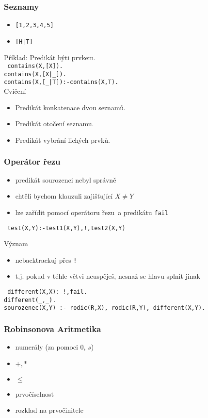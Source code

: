 \documentclass[red,professionalfont]{beamer}
\theoremstyle{definition}
\newcommand{\0}{\mbox{${\bf 0}$}}
\begin{document}
\begin{frame}\frametitle{Seznamy}
\begin{itemize}
 \item {\tt [1,2,3,4,5]}\pause
 \item {\tt [H|T]}\pause
\end{itemize}
 \vskip0.7cm
\alert{Příklad:} Predikát býti prvkem.\pause\\
{\tt
 contains(X,[X]).\pause\\
 contains(X,[X|\_]).\pause\\
 contains(X,[\_|T]):-contains(X,T).\pause\\
 }
 \vskip0.7cm
 \alert{Cvičení}\pause
\begin{itemize}
 \item[1] Predikát konkatenace dvou seznamů.\pause
 \item[2] Predikát otočení seznamu.\pause
 \item[3] Predikát vybrání lichých prvků.
\end{itemize}
\end{frame}

\begin{frame}\frametitle{Operátor řezu}
\begin{itemize}
 \item predikát sourozenci nebyl správně\pause
 \item chtěli bychom klauzuli zajišťující $X \neq Y $\pause
 \item lze zařídit pomocí operátoru řezu\pause\ a predikátu {\tt fail}\pause
\end{itemize}
{\tt
  test(X,Y):-test1(X,Y),!,test2(X,Y)\pause\\
}
\vskip0.7cm
\begin{center}
Význam\pause
\end{center}
\begin{itemize}
 \item nebacktrackuj přes {\tt !}\pause
 \item t.j. pokud v téhle větvi neuspěješ, nesnaž se hlavu splnit jinak\pause
\end{itemize}
\vskip0.4cm
{\tt
  different(X,X):-!,fail.\pause\\
  different(\_,\_).\pause\\
  sourozenec(X,Y) :- rodic(R,X), rodic(R,Y), different(X,Y).\pause\\
}
\end{frame}

\begin{frame}\frametitle{Robinsonova Aritmetika}

\begin{itemize}
 \item[1] numerály (za pomoci $0$, $s$)
 \item[2] $+,*$
 \item[3] $\leq$
 \item[4] prvočíselnost
 \item[5] rozklad na prvočinitele
\end{itemize}
\end{frame}
\end{document}
